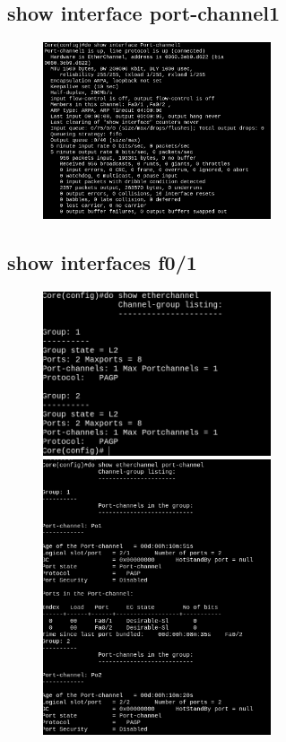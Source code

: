 \documentclass[letterpaper,12pt]{article}
\begin{document}
\begin{sloppypar}
\subsection{show interface port-channel1}
\begin{figure}[H]
    \centering 
    \includegraphics[width = 0.6\textwidth]{portchannel.png}
\end{figure}
\subsection{show interfaces f0/1}
\begin{figure}[H]
    \centering 
    \includegraphics[width=0.6\textwidth]{ehetlist.png}
    \vspace{0.3cm}\\ 
    \includegraphics[width=0.6\textwidth]{ehetport2.png}
\end{figure}

\end{sloppypar}
\end{document}
